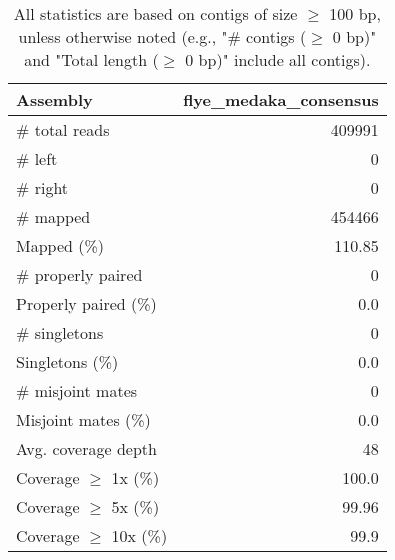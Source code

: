 \documentclass[12pt,a4paper]{article}
\begin{document}
\begin{table}[ht]
\begin{center}
\caption{All statistics are based on contigs of size $\geq$ 100 bp, unless otherwise noted (e.g., "\# contigs ($\geq$ 0 bp)" and "Total length ($\geq$ 0 bp)" include all contigs).}
\begin{tabular}{|l*{1}{|r}|}
\hline
Assembly & flye\_medaka\_consensus \\ \hline
\# total reads & 409991 \\ \hline
\# left & 0 \\ \hline
\# right & 0 \\ \hline
\# mapped & 454466 \\ \hline
Mapped (\%) & 110.85 \\ \hline
\# properly paired & 0 \\ \hline
Properly paired (\%) & 0.0 \\ \hline
\# singletons & 0 \\ \hline
Singletons (\%) & 0.0 \\ \hline
\# misjoint mates & 0 \\ \hline
Misjoint mates (\%) & 0.0 \\ \hline
Avg. coverage depth & 48 \\ \hline
Coverage $\geq$ 1x (\%) & 100.0 \\ \hline
Coverage $\geq$ 5x (\%) & 99.96 \\ \hline
Coverage $\geq$ 10x (\%) & 99.9 \\ \hline
\end{tabular}
\end{center}
\end{table}
\end{document}
